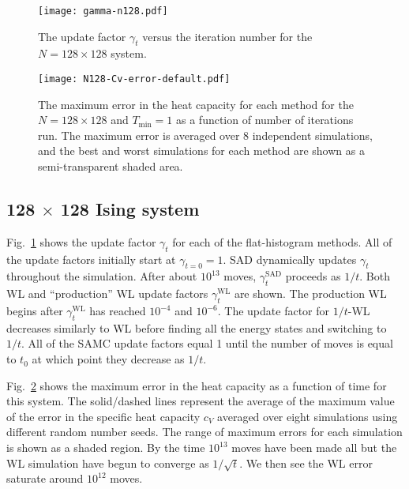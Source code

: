 \documentclass[letterpaper,twocolumn,amsmath,amssymb,pre,aps,10pt]{revtex4-1}
\begin{document}
\begin{figure}
\texttt{[image: gamma-n128.pdf]}
  \caption{
  The update factor $\gamma_t$ versus the iteration number for the $N=128 \times 128$
  system.}
  \label{fig:N128-gamma}
\end{figure}

\begin{figure}
  \texttt{[image: N128-Cv-error-default.pdf]}
  \caption{The maximum error in the heat capacity for each method for the $N=128 \times 128$ and $T_{\min} = 1$ as a function of number of iterations run.  The maximum error is averaged over 8 independent simulations, and the best and worst simulations for each method are shown as a semi-transparent shaded area.}
  \label{fig:N128-cv-error}
\end{figure}


\subsection{128 $\times$ 128 Ising system}
Fig.~\ref{fig:N128-gamma} shows the update factor $\gamma_t$ for each of the flat-histogram methods. All of the update factors initially start at $\gamma_{t=0} = 1$. SAD dynamically updates $\gamma_t$ throughout the simulation. After about $10^{13}$ moves, $\gamma^{\text{SAD}}_t$ proceeds as $1/t$. Both WL and ``production'' WL update factors $\gamma^{\text{WL}}_t$ are shown. The production WL begins after $\gamma^{\text{WL}}_t$ has reached $10^{-4}$ and $10^{-6}$. The update factor for $1/t$-WL decreases similarly to WL before finding all the energy states and switching to $1/t$. All of the SAMC update factors equal 1 until the number of moves is equal to $t_0$ at which point they decrease as $1/t$.

Fig.~\ref{fig:N128-cv-error} shows the maximum error in the heat capacity as a function of time for
this system. The solid/dashed lines
represent the average of the maximum value of the error in the specific heat capacity $c_V$ averaged
over eight simulations using different random number seeds. The range of maximum
errors for each simulation is shown as a shaded region. By
the time $10^{13}$ moves have been made all but the WL simulation have begun to
converge as $1/\sqrt{t}$. We then see the WL error saturate around $10^{12}$ moves.
\end{document}
